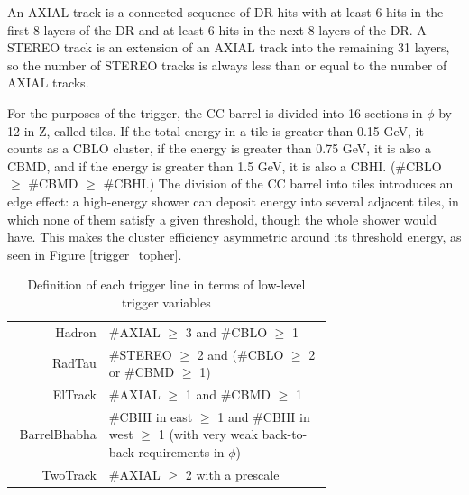 An AXIAL track is a connected sequence of DR hits with at least 6 hits
in the first 8 layers of the DR and at least 6 hits in the next 8
layers of the DR.  A STEREO track is an extension of an AXIAL track
into the remaining 31 layers, so the number of STEREO tracks is always
less than or equal to the number of AXIAL tracks.

For the purposes of the trigger, the CC barrel is divided into 16
sections in $\phi$ by 12 in Z, called tiles.  If the total energy in a
tile is greater than 0.15 GeV, it counts as a CBLO cluster, if the
energy is greater than 0.75 GeV, it is also a CBMD, and if the energy
is greater than 1.5 GeV, it is also a CBHI.  (\#CBLO $\ge$ \#CBMD
$\ge$ \#CBHI.)  The division of the CC barrel into tiles introduces an
edge effect: a high-energy shower can deposit energy into several
adjacent tiles, in which none of them satisfy a given threshold,
though the whole shower would have.  This makes the cluster efficiency
asymmetric around its threshold energy, as seen in Figure
\ref{trigger_topher}.

\begin{table}[p]
  \caption{\label{cuts_triggerlines} Definition of each trigger line
    in terms of low-level trigger variables}
  \begin{center}
    \begin{tabular}{r p{0.7\linewidth}}
      Hadron & \#AXIAL $\ge$ 3 and \#CBLO $\ge$ 1 \\
      RadTau & \#STEREO $\ge$ 2 and (\#CBLO $\ge$ 2 or \#CBMD $\ge$ 1) \\
      ElTrack & \#AXIAL $\ge$ 1 and \#CBMD $\ge$ 1 \\
      BarrelBhabha & \#CBHI in east $\ge$ 1 and \#CBHI in west $\ge$ 1
      (with very weak back-to-back requirements in $\phi$)\\
      TwoTrack & \#AXIAL $\ge$ 2 with a prescale
    \end{tabular}
  \end{center}
\end{table}


